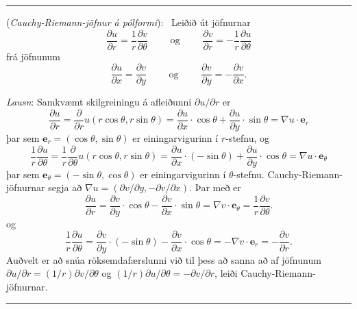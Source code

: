 \bigskip\hrule\bigskip

 
\begin{sy}\label{sy:polhnit} ({\it Cauchy-Riemann-jöfnur á pólformi}): \  Leiðið út 
jöfnurnar 
$$\dfrac{\partial u}{\partial r}=\dfrac 1r\dfrac{\partial v}{\partial
\theta} \qquad \text{ og } \qquad 
\dfrac{\partial v}{\partial r}=-\dfrac 1r\dfrac{\partial u}{\partial
\theta} 
$$ 
frá jöfnunum
$$
\dfrac{\partial u}{\partial x}=\dfrac{\partial v}{\partial y}
\qquad \text{  og } \qquad 
\dfrac{\partial v}{\partial y}=-\dfrac{\partial v}{\partial x}.
$$      

\smallskip\noindent
{\it Lausn}: Samkvæmt skilgreiningu á afleiðunni $\partial u/\partial
r$ er 
$$
\dfrac{\partial u}{\partial r}=\dfrac{\partial}{\partial r} u(r\cos
\theta,r\sin \theta)=\dfrac{\partial u}{\partial x} \cdot \cos \theta
+\dfrac{\partial u}{\partial y}\cdot \sin \theta=\nabla u\cdot 
{\mathbf e}_r
$$
þar sem ${\mathbf e}_r=(\cos \theta,\sin \theta)$ er einingarvigurinn
í $r$-stefnu, og 
$$
\dfrac 1 r\dfrac{\partial u}{\partial \theta}=\dfrac 1r
\dfrac{\partial}{\partial \theta} u(r\cos
\theta,r\sin \theta)=\dfrac{\partial u}{\partial x}\cdot (-\sin \theta)+
\dfrac{\partial u}{\partial y}\cdot \cos \theta=\nabla u\cdot 
{\mathbf e}_\theta
$$
þar sem ${\mathbf e}_\theta=(-\sin \theta,\cos \theta)$ er einingarvigurinn
í $\theta$-stefnu.  Cauchy-Riemann-jöfnurnar segja að 
$\nabla u=(\partial v/\partial y,-\partial v/\partial x)$.  Þar með er
$$
\dfrac{\partial u}{\partial r}=\dfrac{\partial v}{\partial
y}\cdot \cos\theta -\dfrac{\partial v}{\partial x}\cdot \sin \theta= \nabla v\cdot
{\mathbf e}_\theta=\dfrac 1r \dfrac{\partial v}{\partial \theta}.
$$
og 
$$
\dfrac 1r\dfrac{\partial u}{\partial \theta}=\dfrac{\partial v}{\partial
y}\cdot (-\sin\theta) -\dfrac{\partial v}{\partial x}\cdot \cos \theta= -\nabla v\cdot
{\mathbf e}_r=-\dfrac{\partial v}{\partial r}.
$$
 Auðvelt er að snúa röksemdafærslunni við til þess að sanna að
af jöfnunum $\partial u/\partial r=(1/r)\partial v/\partial \theta$
og $(1/r)\partial u/\partial \theta =-\partial v/\partial r$,
leiði Cauchy-Riemann-jöfnurnar.

\end{sy}

\bigskip\hrule\bigskip

